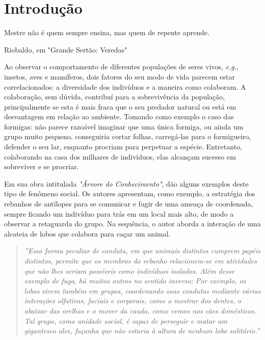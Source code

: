 
\chapter{Introdução}
\label{chap:introducao}

\epigraph{Mestre não é quem sempre ensina, mas quem de repente aprende.}{Riobaldo, em "Grande Sertão: Veredas"}

Ao observar o comportamento de diferentes populações de seres vivos, \textit{e.g.}, insetos, aves e mamíferos, dois fatores do seu modo de vida parecem estar correlacionados: a diversidade dos indivíduos e a maneira como colaboram. A colaboração, sem dúvida, contribuí para a sobrevivência da população, principalmente se esta é mais fraca que o seu predador natural ou está em desvantagem em relação ao ambiente. Tomando como exemplo o caso das formigas: não parece razoável imaginar que uma única formiga, ou ainda um grupo muito pequeno, conseguiria cortar folhas, carregá-las para o formigueiro, defender o seu lar, enquanto procriam para perpetuar a espécie. Entretanto, colaborando na casa dos milhares de indivíduos, elas alcançam sucesso em sobreviver e se procriar.

Em sua obra intitulada \textit{"Árvore do Conhecimento"},  dão alguns exemplos deste tipo de  fenômeno social. Os autores apresentam, como exemplo, a estratégia dos rebanhos de antílopes para se comunicar e fugir de uma ameaça de coordenada, sempre ficando um indivíduo para trás em um local mais alto, de modo a observar a retaguarda do grupo. Na sequência, o autor aborda a interação de uma alcateia de lobos que colabora para caçar um animal.

\begin{quote}
\textit{''Essa forma peculiar de conduta, em que animais distintos cumprem papéis distintos, permite que os membros do rebanho relacionem-se em atividades que não lhes seriam possíveis como indivíduos isolados. Além desse exemplo de fuga, há muitos outros no sentido inverso; Por exemplo, os lobos vivem também em grupos, coordenando suas condutas mediante várias interações olfativas, faciais e corporais, como o mostrar dos dentes, o abaixar das orelhas e o mover da cauda, como vemos nos cães domésticos. Tal grupo, como unidade social, é capaz de perseguir e matar um gigantesco alce, façanha que não estaria à altura de nenhum lobo solitário.''} \cite{maturana2001}
\end{quote}

